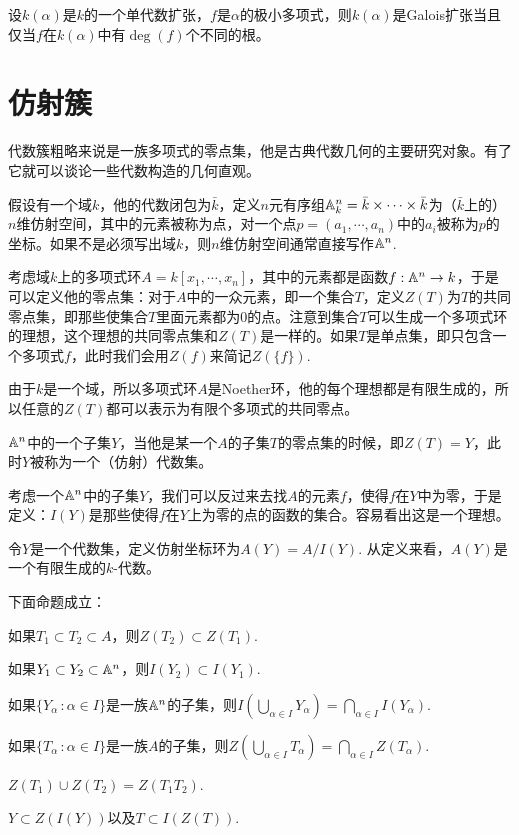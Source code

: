 \begin{pro}
    设$k(\alpha)$是$k$的一个单代数扩张，$f$是$\alpha$的极小多项式，则$k(\alpha)$是Galois扩张当且仅当$f$在$k(\alpha)$中有$\deg(f)$个不同的根。
\end{pro}

\section{仿射簇}
\label{variety}

代数簇粗略来说是一族多项式的零点集，他是古典代数几何的主要研究对象。有了它就可以谈论一些代数构造的几何直观。

\para 假设有一个域$k$，他的代数闭包为$\bar{k}$，定义$n$元有序组$\mathbb{A}^n_k=\bar{k}\times \cdots \times \bar{k}$为（$\bar{k}$上的）$n$维仿射空间，其中的元素被称为点，对一个点$p=(a_1,\cdots ,a_n)$中的$a_i$被称为$p$的坐标。如果不是必须写出域$k$，则$n$维仿射空间通常直接写作$\mathbb{A}^n$.

考虑域$k$上的多项式环$A=k[x_1,\cdots ,x_n]$，其中的元素都是函数$f:\mathbb{A}^n\to k$，于是可以定义他的零点集：对于$A$中的一众元素，即一个集合$T$，定义$Z(T)$为$T$的共同零点集，即那些使集合$T$里面元素都为$0$的点。注意到集合$T$可以生成一个多项式环的理想，这个理想的共同零点集和$Z(T)$是一样的。如果$T$是单点集，即只包含一个多项式$f$，此时我们会用$Z(f)$来简记$Z(\{f\})$.

由于$k$是一个域，所以多项式环$A$是Noether环，他的每个理想都是有限生成的，所以任意的$Z(T)$都可以表示为有限个多项式的共同零点。

\para $\mathbb{A}^n$中的一个子集$Y$，当他是某一个$A$的子集$T$的零点集的时候，即$Z(T)=Y$，此时$Y$被称为一个（仿射）代数集。

考虑一个$\mathbb{A}^n$中的子集$Y$，我们可以反过来去找$A$的元素$f$，使得$f$在$Y$中为零，于是定义：$I(Y)$是那些使得$f$在$Y$上为零的点的函数的集合。容易看出这是一个理想。

\para 令$Y$是一个代数集，定义仿射坐标环为$A(Y)=A/I(Y)$. 从定义来看，$A(Y)$是一个有限生成的$k$-代数。

\begin{pro}下面命题成立：
    \begin{compactenum}[~~~(1)]
        \item 如果$T_1\subset T_2 \subset A$，则$Z(T_2)\subset Z(T_1)$.
        \item 如果$Y_1\subset Y_2 \subset \mathbb{A}^n$，则$I(Y_2)\subset I(Y_1)$.
        \item 如果$\{Y_\alpha\,:\alpha\in I\}$是一族$\mathbb{A}^n$的子集，则$I\left(\bigcup_{\alpha\in I} Y_\alpha\right)=\bigcap_{\alpha\in I} I(Y_\alpha)$.
        \item 如果$\{T_\alpha\,:\alpha\in I\}$是一族$A$的子集，则$Z\left(\bigcup_{\alpha\in I} T_\alpha\right)=\bigcap_{\alpha\in I} Z(T_\alpha)$.
        \item $Z(T_1)\cup Z(T_2)=Z(T_1T_2)$.
        \item $Y\subset Z(I(Y))$以及$T\subset I(Z(T))$.
    \end{compactenum}
\end{pro}

